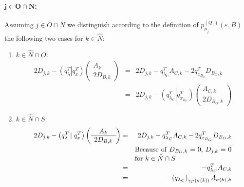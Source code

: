 \documentclass[a4paper]{article}
\newcommand{\pmu}[2]{\ensuremath{p_{\mu_{j}}^{(#1)}(\varepsilon, #2)}}
\begin{document}
\paragraph{$\mathbf{j \in O \cap N}$:}
Assuming $j \in O \cap N$ we distinguish according to the definition of
\pmu{Q_{1}}{B} the following two cases for $k \in
\hat{N}$:
\begin{enumerate}
\item $k \in \hat{N} \cap O$:
\begin{eqnarray}
\label{eq:r1_j_O_N_k_N_O}
    2D_{j, k}
    -\left(q_{\lambda}^{T} \left| \right. q_{x}^{T} \right)
    \left(\begin{array}{c}
            A_{k} \\
	    \hline
	    2D_{B,k}
	  \end{array}
    \right)
&=&
2D_{j, k} - q_{\lambda_{C}}^{T}A_{C, k} - 2q_{x_{B_{O}}}^{T}D_{B_{O},k}
\nonumber \\
&=&
2D_{j, k}
-\left(q_{\lambda_{C}}^{T}\left|\right. q_{x_{B_{O}}}^{T}\right)
\left(\begin{array}{c}
        A_{C, k} \\
	\hline
	2D_{B_{O}, k}
      \end{array}
\right)
\end{eqnarray}
\item $k \in \hat{N} \cap S$:
\begin{eqnarray}
\label{eq:r1_j_O_N_k_N_S}
    2D_{j,k}
    -\left(q_{\lambda}^{T} \left| \right. q_{x}^{T} \right)
    \left(\begin{array}{c}
            A_{k} \\
	    \hline
	    2D_{B, k}
	  \end{array}
    \right)
&=&
2D_{j,k} - q_{\lambda_{C}}^{T}A_{C, k} - 2q_{x_{B_{O}}}^{T}D_{B_{O},k}
\nonumber \\
&&\begin{minipage}{5cm}
Because of $D_{B_{O},k}=0$, $D_{j,k}=0$ for $k \in \hat{N} \cap S$
\end{minipage}
\nonumber \\
&=&
-q_{\lambda_{C}}^{T}A_{C, k}
\nonumber \\
&=&
-\left(q_{\lambda_{C}}\right)_{\gamma_{C}(\sigma(k))}A_{\sigma(k),k}
\end{eqnarray}
\end{enumerate}
\end{document}
